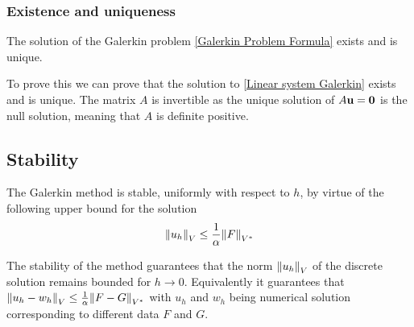 \subsubsection*{Existence and uniqueness}
\begin{corollary}
    The solution of the Galerkin problem \eqref{Galerkin Problem Formula} exists and is unique.
\end{corollary}
To prove this we can prove that the solution to \eqref{Linear system Galerkin} exists and is unique. The matrix \(A\) is invertible as the unique solution of \(A\textbf{u} = \textbf{0}\) is the null solution, meaning that \(A\) is definite positive.
\subsection*{Stability}
\begin{corollary}
    The Galerkin method is stable, uniformly with respect to \(h\), by virtue of the following upper bound for the solution
    \[
        \norm{u_h}_V \leq \frac{1}{\alpha}\norm{F}_{V^*}
    \]
\end{corollary}
The stability of the method guarantees that the norm \(\norm{u_h}_V\) of the discrete solution remains bounded for \(h \to 0\). Equivalently it guarantees that \(\norm{u_h-w_h}_V \leq \frac{1}{\alpha}\norm{F-G}_{V^*}\) with \(u_h\) and \(w_h\) being numerical solution corresponding to different data \(F\) and \(G\).
